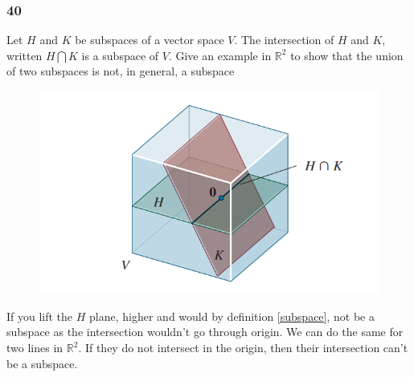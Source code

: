     \subsubsection*{40}
    Let $ H $ and  $ K $ be subspaces of a vector space $ V $. The intersection of $ H $ and $ K $, written $ H \bigcap K $ is a subspace of $ V $. Give an example in $ \mathbb R^{2}  $ to show that the union of two subspaces is not, in general, a subspace 
    \begin{figure}[h!]
      \centering
      \includegraphics[scale = .7]{Bilder/HK_intersect.png}
      \caption{}
      \label{fig:figure1}
    \end{figure}
    \newline \newline 

    If you lift the $ H $ plane, higher and would by definition \ref{subspace}, not be a subspace as the intersection wouldn't go through origin. We can do the same for two lines in $ \mathbb R^{2} $. If they do not intersect in the origin, then their intersection can't be a subspace. 

